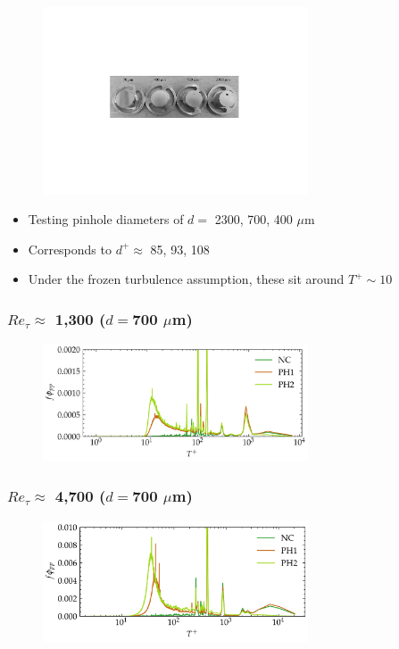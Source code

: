 \documentclass[aspectratio=169,9pt]{beamer}
\begin{document}
\begin{frame}
  \frametitle{}
  \begin{figure}
    \centering
    \includegraphics[width=0.7\textwidth]{pinholes.pdf}
  \end{figure}

  \begin{itemize}
    \centering
        \item Testing pinhole diameters of $d=$ 2300, 700, 400 $\mu$m
        \item Corresponds to $d^+ \approx$ 85, 93, 108
        \item Under the frozen turbulence assumption, these sit around $T^+\sim 10$
    \end{itemize}
\end{frame}

\begin{frame}
  \frametitle{$Re_\tau\approx$ 1,300 ($d=$700 $\mu$m)}
  \begin{figure}
    \centering
    \includegraphics[width=0.7\textwidth]{raw_spectra/400_atm_raw_spec.png}
  \end{figure}
\end{frame}

\begin{frame}
  \frametitle{$Re_\tau \approx$ 4,700 ($d=$700 $\mu$m)}
  \begin{figure}
    \centering
    \includegraphics[width=0.7\textwidth]{raw_spectra/400_50psi_raw_spec.png}
  \end{figure}
\end{frame}
\end{document}
